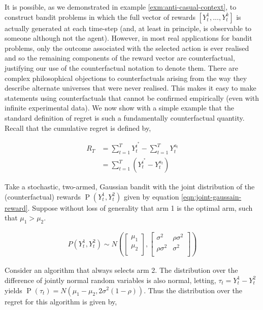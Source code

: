 \documentclass[11pt,a4paper,oneside]{book}
\newcommand{\eqn}[1]{\begin{align}#1\end{align}}
\renewcommand{\P}[1]{\operatorname{P}\left(#1\right)}
\newcommand{\cfb}[2]{{#1}_t^{#2}} %
\newcommand{\rawregret}{R_{T}} %
\theoremstyle{plain}
\theoremstyle{definition}
\begin{document}
It is possible, as we demonstrated in example \ref{exm:anti-casual-context}, to construct bandit problems in which the full vector of rewards $[\cfb{Y}{1},...,\cfb{Y}{k}]$ is actually generated at each time-step (and, at least in principle, is observable to someone although not the agent). However, in most real applications for bandit problems, only the outcome associated with the selected action is ever realised and so the remaining components of the reward vector are counterfactual, justifying our use of the counterfactual notation to denote them. There are complex philosophical objections to counterfactuals arising from the way they describe alternate universes that were never realised. This makes it easy to make statements using counterfactuals that cannot be confirmed empirically (even with infinite experimental data). We now show with a simple example that the standard definition of regret is such a fundamentally counterfactual quantity. Recall that the cumulative regret is defined by,

\eqn{
\label{eqn:raw_regret2}
\rawregret &= \sum_{t=1}^T \cfb{Y}{i^*} - \sum_{t=1}^T \cfb{Y}{a_t}
\\&= \sum_{t=1}^T \left(\cfb{Y}{i^*} - \cfb{Y}{a_t}\right)
}

Take a stochastic, two-armed, Gaussian bandit with the joint distribution of the (counterfactual) rewards $\P{\cfb{Y}{1},\cfb{Y}{2}}$ given by equation \ref{eqn:joint-gaussain-reward}. Suppose without loss of generality that arm 1 is the optimal arm, such that $\mu_1 > \mu_2$.  

\eqn{
\label{eqn:joint-gaussain-reward}
P(\cfb{Y}{1},\cfb{Y}{2}) \sim N( 
         \begin{bmatrix}
           \mu_{1} \\
           \mu_2 \\
         \end{bmatrix},
         \begin{bmatrix}
           \sigma^2 & \rho \sigma^2 \\
           \rho \sigma^2 & \sigma^2 \\
         \end{bmatrix}
         )
}

Consider an algorithm that always selects arm 2.  The distribution over the difference of jointly normal random variables is also normal, letting, $\tau_t = \cfb{Y}{1} - \cfb{Y}{2}$ yields $\P{\tau_t} = N(\mu_1 - \mu_2,2\sigma^{2}(1-\rho))$. Thus the distribution over the regret for this algorithm is given by,
\end{document}
